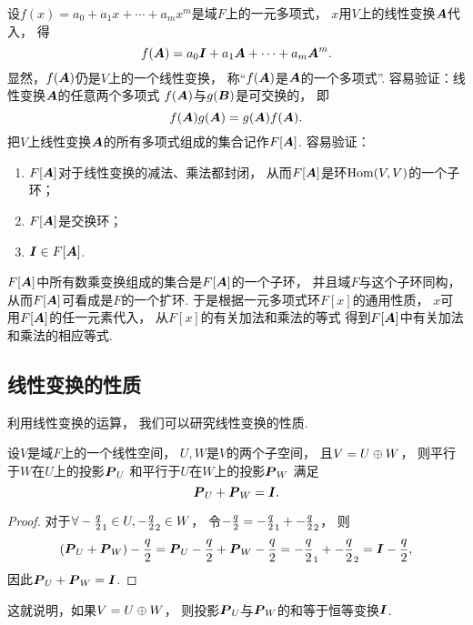 设\(f(x)=a_0+a_1 x+\dotsb+a_m x^m\)是域\(F\)上的一元多项式，
\(x\)用\(V\)上的线性变换\(\boldsymbol{A}\)代入，
得\[
	f(\boldsymbol{A})=a_0\boldsymbol{I}+a_1\boldsymbol{A}+\dotsb+a_m\boldsymbol{A}^m.
\]
显然，\(f(\boldsymbol{A})\)仍是\(V\)上的一个线性变换，
称“\(f(\boldsymbol{A})\)是\(\boldsymbol{A}\)的一个多项式”.
容易验证：线性变换\(\boldsymbol{A}\)的任意两个多项式
\(f(\boldsymbol{A})\)与\(g(\boldsymbol{B})\)是可交换的，
即\[
	f(\boldsymbol{A}) g(\boldsymbol{A})
	=g(\boldsymbol{A}) f(\boldsymbol{A}).
\]
把\(V\)上线性变换\(\boldsymbol{A}\)的所有多项式组成的集合记作\(F[\boldsymbol{A}]\).
容易验证：
\begin{enumerate}
	\item \(F[\boldsymbol{A}]\)对于线性变换的减法、乘法都封闭，
	从而\(F[\boldsymbol{A}]\)是环\(\operatorname{Hom}(V,V)\)的一个子环；

	\item \(F[\boldsymbol{A}]\)是交换环；

	\item \(\boldsymbol{I}\in F[\boldsymbol{A}]\).
\end{enumerate}
\(F[\boldsymbol{A}]\)中所有数乘变换组成的集合是\(F[\boldsymbol{A}]\)的一个子环，
并且域\(F\)与这个子环同构，
从而\(F[\boldsymbol{A}]\)可看成是\(F\)的一个扩环.
于是根据一元多项式环\(F[x]\)的通用性质，
\(x\)可用\(F[\boldsymbol{A}]\)的任一元素代入，
从\(F[x]\)的有关加法和乘法的等式
得到\(F[\boldsymbol{A}]\)中有关加法和乘法的相应等式.

\subsection{线性变换的性质}
利用线性变换的运算，
我们可以研究线性变换的性质.
\begin{proposition}
设\(V\)是域\(F\)上的一个线性空间，
\(U,W\)是\(V\)的两个子空间，
且\(V=U \oplus W\)，
则平行于\(W\)在\(U\)上的投影\(\boldsymbol{P}_U\)
和平行于\(U\)在\(W\)上的投影\(\boldsymbol{P}_W\)
满足\[
	\boldsymbol{P}_U+\boldsymbol{P}_W=\boldsymbol{I}.
\]
\begin{proof}
对于\(\forall-\frac{q}{2}_1\in U,
-\frac{q}{2}_2\in W\)，
令\(-\frac{q}{2}=-\frac{q}{2}_1+-\frac{q}{2}_2\)，
则\[
	(\boldsymbol{P}_U+\boldsymbol{P}_W)-\frac{q}{2}
	=\boldsymbol{P}_U-\frac{q}{2}+\boldsymbol{P}_W-\frac{q}{2}
	=-\frac{q}{2}_1+-\frac{q}{2}_2
	=\boldsymbol{I}-\frac{q}{2},
\]
因此\(\boldsymbol{P}_U+\boldsymbol{P}_W=\boldsymbol{I}\).
\end{proof}
\end{proposition}
这就说明，如果\(V=U \oplus W\)，
则投影\(\boldsymbol{P}_U\)与\(\boldsymbol{P}_W\)的和等于恒等变换\(\boldsymbol{I}\).
